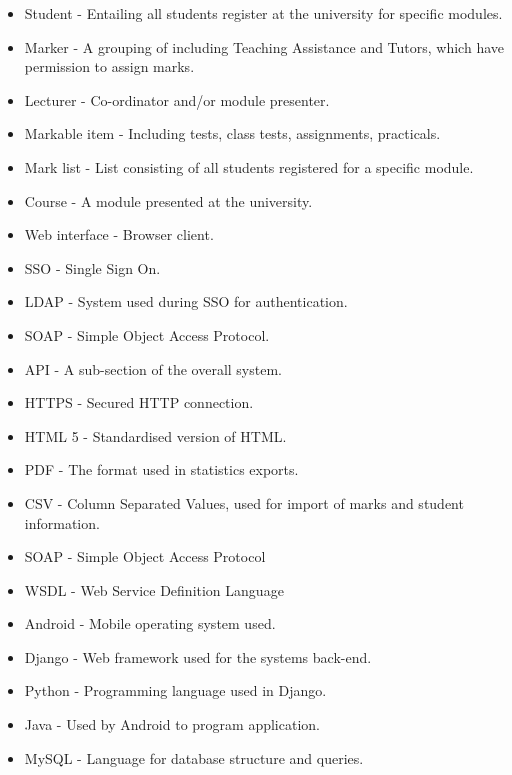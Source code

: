 \documentclass[12pt]{article}
\begin{document}
		\vspace{0.2in}
		\begin{itemize}
			\item Student - Entailing all students register at the university for specific modules.
			\item Marker - A grouping of including Teaching Assistance and Tutors, which have permission to assign marks.
			\item Lecturer - Co-ordinator and/or module presenter.
			
			\item Markable item - Including tests, class tests, assignments, practicals.
			\item Mark list - List consisting of all students registered for a specific module.
			\item Course - A module presented at the university.
			
			\item Web interface - Browser client.
			\item SSO - Single Sign On.
			\item LDAP - System used during SSO for authentication.
			\item SOAP - Simple Object Access Protocol.
			\item API -	A sub-section of the overall system.
			\item HTTPS - Secured HTTP connection.
			\item HTML 5 - Standardised version of HTML.
			\item PDF -	The format used in statistics exports.
			\item CSV -	Column Separated Values, used for import of marks and student information.
			\item SOAP - Simple Object Access Protocol	
			\item WSDL - Web Service Definition Language
			\item Android - Mobile operating system used.
			\item Django - Web framework used for the systems back-end.
			\item Python - Programming language used in Django.
			\item Java - Used by Android to program application.
			\item MySQL - Language for database structure and queries.
		\end{itemize}	
	
\end{document}
